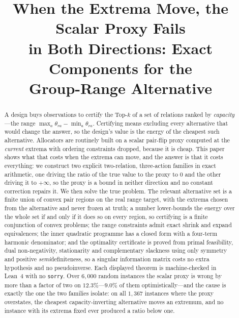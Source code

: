 \documentclass[conference]{IEEEtran}
\theoremstyle{definition}
\begin{document}
\title{When the Extrema Move, the Scalar Proxy Fails\\
in Both Directions: Exact Components for the\\
Group-Range Alternative}

\author{
}

\maketitle

\begin{abstract}
A design buys observations to certify the Top-$k$ of a set of relations ranked by
\emph{capacity}---the range $\max_{a}\theta_{ra}-\min_{a}\theta_{ra}$. Certifying means
excluding every alternative that would change the answer, so the design's value is the energy
of the cheapest such alternative. Allocators are routinely built on a scalar pair-flip proxy
computed at the \emph{current} extrema with ordering constraints dropped, because it is
cheap. This paper shows what that costs when the extrema can move, and the answer is that it
costs everything: we construct two explicit two-relation, three-action families in exact
arithmetic, one driving the ratio of the true value to the proxy to $0$ and the other driving
it to $+\infty$, so the proxy is a bound in neither direction and no constant correction
repairs it. We then solve the true problem. The relevant alternative set is a finite union of
convex pair regions on the real range target, with the extrema chosen from the alternative
and never frozen at truth; a number lower-bounds the energy over the whole set if and only if
it does so on every region, so certifying is a finite conjunction of convex problems; the
range constraints admit exact shrink and expand equivalences; the inner quadratic programme
has a closed form with a four-term harmonic denominator; and the optimality certificate is
proved from primal feasibility, dual non-negativity, stationarity and complementary slackness
using only symmetry and positive \emph{semi}definiteness, so a singular information matrix
costs no extra hypothesis and no pseudoinverse. Each displayed theorem is machine-checked in
Lean~4 with no \texttt{sorry}. Over $6{,}000$ random instances the scalar proxy is wrong by
more than a factor of two on $12.3\%$---$9.0\%$ of them optimistically---and the cause is
exactly the one the two families isolate: on all $1{,}367$ instances where the proxy
overstates, the cheapest capacity-inverting alternative moves an extremum, and no instance
with its extrema fixed ever produced a ratio below one.
\end{abstract}
\end{document}
